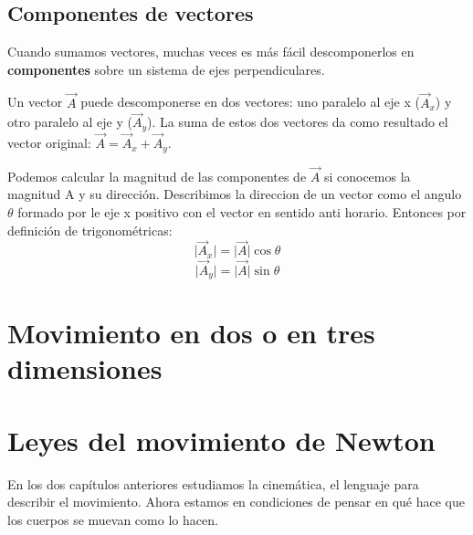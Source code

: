 \documentclass{article}
\newcommand{\newsection}[1]{
    \section{\centering \color{sectionColor} \bl{#1}}
}
\newcommand{\newsubsection}[1]{
    \subsection{\color{sectionColor} #1}
}
\newcommand{\bl}[1]{\textbf{#1}}
\begin{document}

    \newsubsection{Componentes de vectores}

    \par Cuando sumamos vectores, muchas veces es más fácil descomponerlos en \bl{componentes} sobre un sistema de ejes perpendiculares.
    \par Un vector \(\vec{A}\) puede descomponerse en dos vectores: uno paralelo al eje x (\(\vec{A}_x\)) y otro paralelo al eje y (\(\vec{A}_y\)). La suma de estos dos vectores da como resultado el vector original: \(\vec{A}=\vec{A}_x+\vec{A}_y\).

    \begin{figure}[H]
        \centering
        \shorthandoff{>}
        \shorthandon{>}
    \end{figure}

    \par Podemos calcular la magnitud de las componentes de $\vec{A}$ si conocemos la magnitud A y su dirección. Describimos la direccion de un vector como el angulo $\theta$ formado por le eje x positivo con el vector en sentido anti horario. Entonces por definición de trigonométricas:
    \[ \lvert \vec{A}_x \rvert = \lvert \vec{A} \rvert \cos \theta \]
    \[ \lvert \vec{A}_y \rvert = \lvert \vec{A} \rvert \sin \theta \]

\newsection{Movimiento en dos o en tres dimensiones}


\newsection{Leyes del movimiento de Newton}

\par En los dos capítulos anteriores estudiamos la cinemática, el lenguaje para describir el movimiento. Ahora estamos en condiciones de pensar en qué hace que los cuerpos se muevan como lo hacen.
\end{document}
